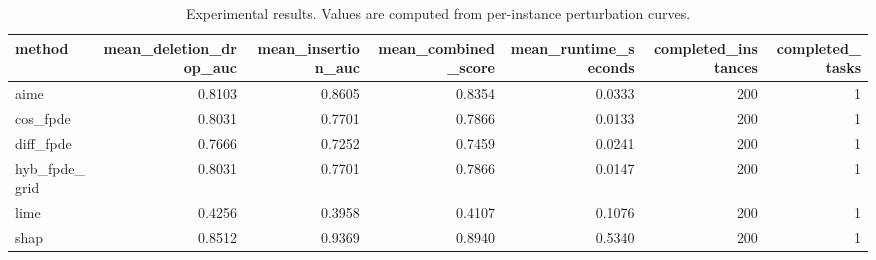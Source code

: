 \begin{table}[t]
\caption{Experimental results. Values are computed from per-instance perturbation curves.}
\label{tab:main_results_computed}
\centering
\begin{tabular}{lrrrrrr}
\toprule
method & mean\_deletion\_drop\_auc & mean\_insertion\_auc & mean\_combined\_score & mean\_runtime\_seconds & completed\_instances & completed\_tasks \\
\midrule
aime & 0.8103 & 0.8605 & 0.8354 & 0.0333 & 200 & 1 \\
cos\_fpde & 0.8031 & 0.7701 & 0.7866 & 0.0133 & 200 & 1 \\
diff\_fpde & 0.7666 & 0.7252 & 0.7459 & 0.0241 & 200 & 1 \\
hyb\_fpde\_grid & 0.8031 & 0.7701 & 0.7866 & 0.0147 & 200 & 1 \\
lime & 0.4256 & 0.3958 & 0.4107 & 0.1076 & 200 & 1 \\
shap & 0.8512 & 0.9369 & 0.8940 & 0.5340 & 200 & 1 \\
\bottomrule
\end{tabular}

\end{table}
